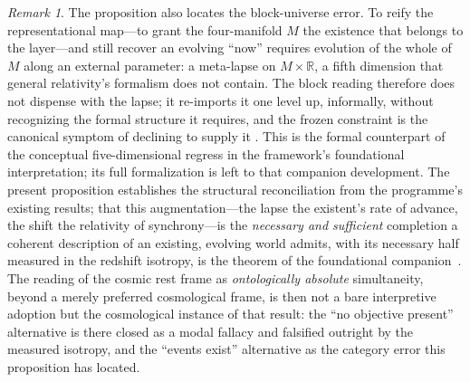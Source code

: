 \documentclass[11pt,a4paper]{article}
\theoremstyle{plain}
\theoremstyle{definition}
\theoremstyle{remark}
\newtheorem{remark}{Remark}
\begin{document}
\begin{remark}
The proposition also locates the block-universe error. To reify the representational map---to grant the four-manifold $M$ the existence that belongs to the layer---and still recover an evolving ``now'' requires evolution of the whole of $M$ along an external parameter: a meta-lapse on $M\times\mathbb{R}$, a fifth dimension that general relativity's formalism does not contain. The block reading therefore does not dispense with the lapse; it re-imports it one level up, informally, without recognizing the formal structure it requires, and the frozen constraint is the canonical symptom of declining to supply it \cite{JanzenCanonicalTime}. This is the formal counterpart of the conceptual five-dimensional regress \cite{JanzenTrope} in the framework's foundational interpretation; its full formalization is left to that companion development. The present proposition establishes the structural reconciliation from the programme's existing results; that this augmentation---the lapse the existent's rate of advance, the shift the relativity of synchrony---is the \emph{necessary and sufficient} completion a coherent description of an existing, evolving world admits, with its necessary half measured in the redshift isotropy, is the theorem of the foundational companion~\cite{JanzenModernParallax}. The reading of the cosmic rest frame as \emph{ontologically absolute} simultaneity, beyond a merely preferred cosmological frame, is then not a bare interpretive adoption but the cosmological instance of that result: the ``no objective present'' alternative is there closed as a modal fallacy and falsified outright by the measured isotropy, and the ``events exist'' alternative as the category error this proposition has located.
\end{remark}
\end{document}
